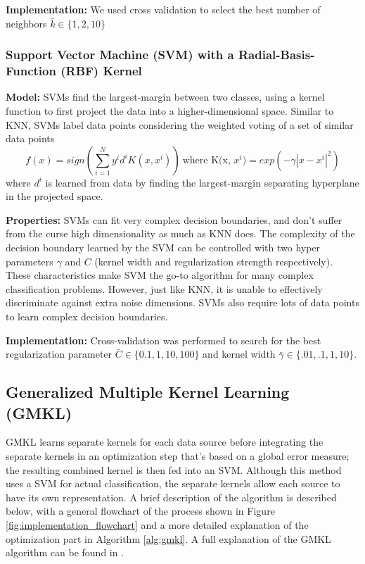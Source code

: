 \documentclass{article}
\begin{document}
\textbf{Implementation:}
We used cross validation to select the best number of neighbors $\bar{k} \in
\{1, 2, 10\}$




\subsubsection*{Support Vector Machine (SVM) with a Radial-Basis-Function (RBF)
    Kernel}
\textbf{Model:}
SVMs find the largest-margin between two classes, using a kernel function to
first project the data into a higher-dimensional space. Similar to KNN, SVMs
label data points considering the weighted voting of a set of similar data
points
$$
f(x)
= sign(\sum_{i=1}^{N} y^i d^i K(x, x^i))\ \text{where K(x, $x^i$)}
= exp(-\gamma|x - x^i|^2)
$$
where $d^i$ is learned from data by finding the largest-margin separating
hyperplane in the projected space.

\textbf{Properties:}
SVMs can fit very complex decision boundaries, and don't suffer from the curse
high dimensionality as much as KNN does. The complexity of the decision
boundary learned by the SVM can be controlled with two hyper parameters
$\gamma$ and $C$ (kernel width and regularization strength respectively). These
characteristics make SVM the go-to algorithm for many complex classification
problems. However, just like KNN, it is unable to effectively discriminate
against extra noise dimensions. SVMs also require lots of data points to learn
complex decision boundaries.

\textbf{Implementation:}
Cross-validation was performed to search for the best regularization parameter
$\bar{C} \in \{0.1, 1, 10, 100\}$ and kernel width $\bar{\gamma} \in \{.01, .1,
1, 10\}$.




\subsection*{Generalized Multiple Kernel Learning (GMKL)}
GMKL learns separate kernels for each data source before integrating the
separate kernels in an optimization step that's based on a global error
measure; the resulting combined kernel is then fed into an SVM. Although this
method uses a SVM for actual classification, the separate kernels allow each
source to have its own representation. A brief description of the algorithm is
described below, with a general flowchart of the process shown in Figure
\ref{fig:implementation_flowchart} and a more detailed explanation of the
optimization part in Algorithm \ref{alg:gmkl}. A full explanation of the GMKL
algorithm can be found in \cite{gmkl}.
\end{document}
